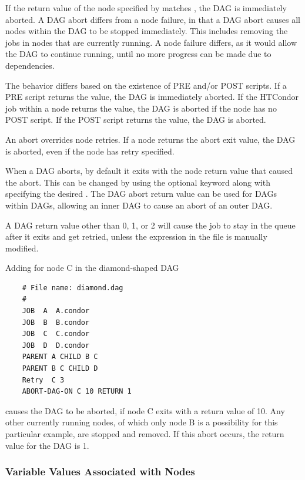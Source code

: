 If the return value of the node specified by 
matches ,
the DAG is immediately aborted.
A DAG abort differs from a node failure,
in that a DAG abort causes all nodes within the DAG to be stopped immediately.
This includes removing the jobs in nodes that are currently running.
A node failure differs, as it would allow the DAG to continue running,
until no more progress can be made due to dependencies.

The behavior differs based on the existence of PRE and/or POST scripts.
If a PRE script returns the  value,
the DAG is immediately aborted.
If the HTCondor job within a node returns the  value,
the DAG is aborted if the node has no POST script.
If the POST script returns the  value, the DAG is aborted.

An abort overrides node retries. 
If a node returns the abort exit value,
the DAG is aborted,
even if the node has retry specified.

When a DAG aborts, by default it exits with the node return value that
caused the abort.  This can be changed by 
using  the optional  keyword along
with specifying the desired .
The DAG abort return value
can be used for DAGs within DAGs,
allowing an inner DAG to cause an abort of an outer DAG.

A DAG return value other than 0, 1, or 2 will cause the
 job to stay in the queue after it exits
and get retried, unless the  expression in the
 file is manually modified.

Adding  for node C in the diamond-shaped
DAG
\footnotesize
\begin{verbatim}
    # File name: diamond.dag
    #
    JOB  A  A.condor 
    JOB  B  B.condor 
    JOB  C  C.condor	
    JOB  D  D.condor
    PARENT A CHILD B C
    PARENT B C CHILD D
    Retry  C 3
    ABORT-DAG-ON C 10 RETURN 1
\end{verbatim}
\normalsize

causes the DAG to be aborted, if node C exits with a return value of 10.
Any other currently running nodes, 
of which only node B is a possibility for this particular example, 
are stopped and removed.
If this abort occurs, the return value for the DAG is 1.


\subsubsection{\label{dagman:VARS}Variable Values Associated with Nodes}

